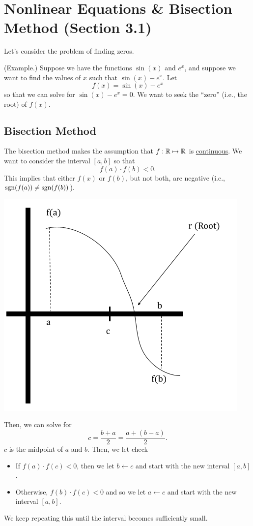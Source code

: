 \documentclass[letterpaper]{article}
\begin{document}
\section{Nonlinear Equations \& Bisection Method (Section 3.1)}
Let's consider the problem of finding zeros.

\begin{mdframed}
    (Example.) Suppose we have the functions $\sin(x)$ and $e^x$, and suppose we want to find the values of $x$ such that $\sin(x) - e^x$. Let \[f(x) = \sin(x) - e^x\] so that we can solve for $\sin(x) - e^x = 0$. We want to seek the ``zero'' (i.e., the root) of $f(x)$. 
\end{mdframed}

\subsection{Bisection Method}
The bisection method makes the assumption that $f: \mathbb{R} \mapsto \mathbb{R}$ is \underline{continuous}. We want to consider the interval $[a, b]$ so that \[f(a) \cdot f(b) < 0.\] This implies that either $f(x)$ or $f(b)$, but not both, are negative (i.e., $\operatorname{sgn}(f(a)) \neq \operatorname{sgn}(f(b))$).

\begin{center}
    \includegraphics[scale=0.6]{../assets/bisect.png}
\end{center}

Then, we can solve for 
\[c = \frac{b + a}{2} = \frac{a + (b - a)}{2}.\]
$c$ is the midpoint of $a$ and $b$. Then, we let check 
\begin{itemize}
    \item If $f(a) \cdot f(c) < 0$, then we let $b \leftarrow c$ and start with the new interval $[a, b]$. 
    \item Otherwise, $f(b) \cdot f(c) < 0$ and so we let $a \leftarrow c$ and start with the new interval $[a, b]$. 
\end{itemize}
We keep repeating this until the interval becomes sufficiently small. 
\end{document}
